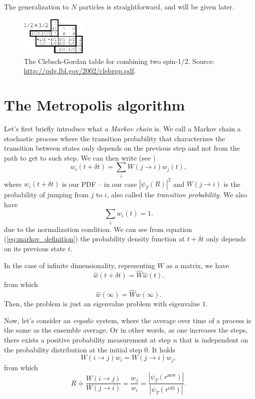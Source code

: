 \documentclass[a4paper,twoside,11pt]{book}
\begin{document}
The generalization to $N$ particles is straightforward, and will be given later.

\begin{figure}[H]
	\centering
	\includegraphics[width=0.28\textwidth]{CGt}
	\caption{The Clebsch-Gordan table for combining two spin-1/2. Source: \url{http://pdg.lbl.gov/2002/clebrpp.pdf}.}
	\label{fig:CGt}
\end{figure}

\section{The Metropolis algorithm}

Let's first briefly introduce what a \emph{Markov chain} is. We call a Markov chain a stochastic process where the transition probability that characterizes the transition between states only depends on the previous step and not from the path to get to such step. We can then write (see \cite{morten})
\begin{equation}
	w_i(t+\delta t)=\sum_i W(j \rightarrow i) w_j (t),
	\label{eq:markov_definition}
\end{equation}
where $w_i(t+\delta t)$ is our PDF -- in our case $|\psi_T(R)|^2$ and $W(j \rightarrow i)$ is the probability of jumping from $j$ to $i$, also called the \emph{transition probability}. We also have
\begin{equation}
	\sum_{i}w_i(t) = 1.
\end{equation}
due to the normalization condition. We can see from equation (\ref{eq:markov_definition}) the probability density function at $t+\delta t$ only depends on its previous state $t$. 

In the case of infinite dimensionality, representing $W$ as a matrix, we have
\begin{equation}
	\hat{w}(t+\delta t) = \hat{W}\hat{w}(t).
\end{equation}
from which
\begin{equation}
	\hat{w}(\infty)= \hat{W} \hat{w}(\infty).
\end{equation}
Then, the problem is just an eigenvalue problem with eigenvalue $1$.

Now, let's consider an \emph{ergodic} system, where the average over time of a process is the same as the ensemble average. Or in other words, as one increases the steps, there exists a positive probability measurement at step $n$ that is independent on the probability distribution at the initial step $0$. It holds
\begin{equation}
	W(i \rightarrow j) w_i= W(j \rightarrow i) w_j,
\end{equation}
from which
\begin{equation}
	R \doteqdot \frac{W(i \rightarrow j)}{W(j \rightarrow i)}=\frac{w_j}{w_i}=\frac{|\psi_T (r^{\text{new}})|}{|\psi_T (r^{\text{old}})|}.
\end{equation}
\end{document}
